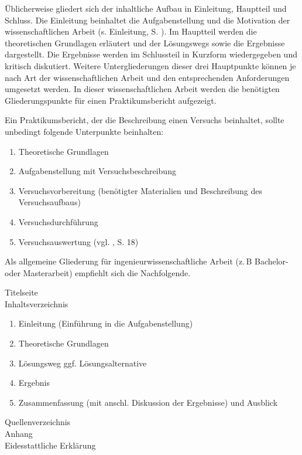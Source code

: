 \noindent
Üblicherweise gliedert sich der inhaltliche Aufbau in Einleitung, Hauptteil und Schluss.
Die Einleitung beinhaltet die Aufgabenstellung und die Motivation der wissenschaftlichen Arbeit (s. Einleitung, S. \pageref{sec:Einleitung}).
Im Hauptteil werden die theoretischen Grundlagen erläutert und der Lösungswegs sowie die Ergebnisse dargestellt.
Die Ergebnisse werden im Schlussteil in Kurzform wiedergegeben und kritisch diskutiert.
Weitere Untergliederungen dieser drei Hauptpunkte können je nach Art der wissenschaftlichen Arbeit und den entsprechenden Anforderungen umgesetzt werden.
In dieser wissenschaftlichen Arbeit werden die benötigten Gliederungspunkte für einen Praktikumsbericht aufgezeigt.

Ein Praktikumsbericht, der die Beschreibung einen Versuchs beinhaltet, sollte unbedingt folgende Unterpunkte beinhalten:
\begin{enumerate}
\item Theoretische Grundlagen 
\item Aufgabenstellung mit Versuchsbeschreibung
\item Versuchsvorbereitung (benötigter Materialien und Beschreibung des Versuchsaufbaus)
\item Versuchsdurchführung
\item Versuchsauswertung (vgl. \cite{Hering2009}, S. 18)
\end{enumerate}

Als allgemeine Gliederung für ingenieurwissenschaftliche Arbeit (z.\,B Bachelor- oder Masterarbeit) empfiehlt sich die Nachfolgende. 

Titelseite\\
Inhaltsverzeichnis
\begin{enumerate}
	\item Einleitung (Einführung in die Aufgabenstellung)
  \item Theoretische Grundlagen
	\item Lösungsweg ggf. Lösungsalternative
  \item Ergebnis
  \item Zusammenfassung (mit anschl. Diskussion der Ergebnisse) und Ausblick
\end{enumerate}
Quellenverzeichnis\\
Anhang\\
Eidesstattliche Erklärung 
